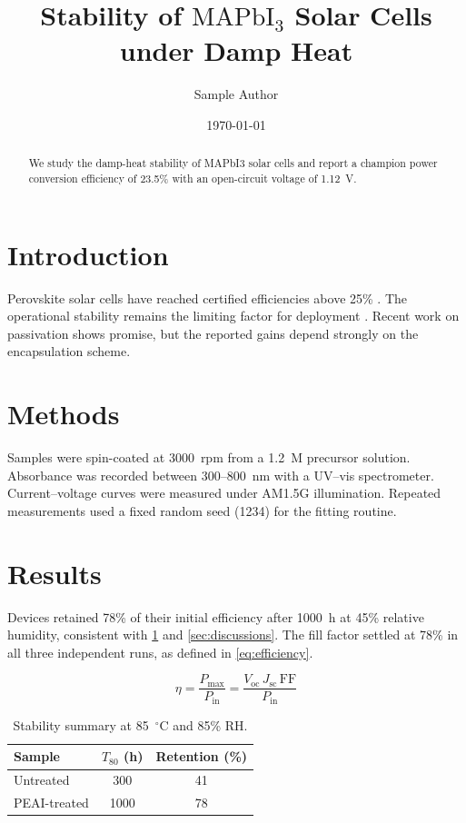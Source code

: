 \documentclass[11pt,a4paper]{article}
\title{Stability of $\mathrm{MAPbI_3}$ Solar Cells under Damp Heat}
\author{Sample Author}
\date{\today}
\begin{document}
\maketitle

\begin{abstract}
We study the damp-heat stability of MAPbI3 solar cells and report a champion
power conversion efficiency of 23.5\% with an open-circuit voltage of 1.12~V.
\end{abstract}

\section{Introduction}
Perovskite solar cells have reached certified efficiencies above 25\% \cite{smith2021}.
The operational stability remains the limiting factor for deployment \cite{li2020}.
Recent work on passivation shows promise, but the reported gains
depend strongly on the encapsulation scheme.
\section{Methods}
Samples were spin-coated at 3000~rpm from a 1.2~M precursor solution.
Absorbance was recorded between 300--800~nm with a UV--vis spectrometer.
Current--voltage curves were measured under AM1.5G illumination.
Repeated measurements used a fixed random seed (1234) for the fitting routine.

\section{Results}
Devices retained 78\% of their initial efficiency after 1000~h at 45\% relative
humidity, consistent with \cref{tab:stability} and \cref{sec:discussions}.
The fill factor settled at 78\% in all three independent runs, as defined in \eqref{eq:efficiency}.

\begin{equation}
\label{eq:efficiency}
\eta = \frac{P_{\max}}{P_{\mathrm{in}}} = \frac{V_{\mathrm{oc}}\,J_{\mathrm{sc}}\,\mathrm{FF}}{P_{\mathrm{in}}}
\end{equation}

\begin{table}[t]
\centering
\caption{Stability summary at 85~$^\circ$C and 85\% RH.}
\label{tab:stability}
\begin{tabular}{lcc}
\toprule
Sample & $T_{80}$ (h) & Retention (\%) \\
\midrule
Untreated & 300 & 41 \\
PEAI-treated & 1000 & 78 \\
\bottomrule
\end{tabular}
\end{table}
\end{document}
